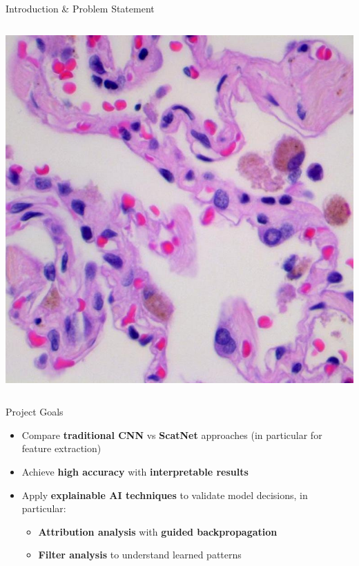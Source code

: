 \documentclass[aspectratio=169,8pt]{beamer}  %
\begin{document}
\begin{frame}{Introduction \& Problem Statement}
\begin{columns}[T]
\begin{column}{0.5\textwidth}
\vspace{0.2cm}
\hfill\includegraphics[width=0.95\linewidth, height=0.45\textheight]{imgs/benign.jpg}
\end{column}
\end{columns}
\end{frame}

\begin{frame}{Project Goals}
\begin{itemize}
\item Compare \textbf{traditional CNN} vs \textbf{ScatNet} approaches (in particular for feature extraction)
\item Achieve \textbf{high accuracy} with \textbf{interpretable results}
\item Apply \textbf{explainable AI techniques} to validate model decisions, in particular:
  \begin{itemize}
  \item \textbf{Attribution analysis} with \textbf{guided backpropagation} 
  \item \textbf{Filter analysis} to understand learned patterns
  \end{itemize}
\end{itemize}
\end{frame}
\end{document}
